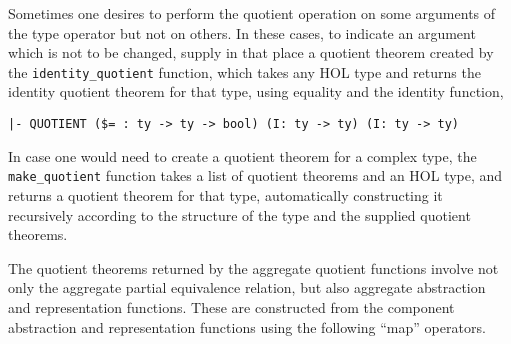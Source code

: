 \documentclass[envcountsame,runningheads]{llncs}
\newcommand{\quotient}{partial equivalence}
\begin{document}
Sometimes one desires to perform the quotient operation on some
arguments of the type operator but not on others. In these
cases, to indicate an argument which is not to be changed,
supply in that place
a quotient theorem
created by the
{\tt identity\_quotient} function, which takes any HOL type and 
returns the identity quotient theorem for that type,
using equality and the identity function,

\begin{center}
{\tt |- QUOTIENT (\$= : ty -> ty -> bool) (I: ty -> ty) (I: ty -> ty)}
\end{center}

In case one would need to create a quotient theorem for a complex type,
the {\tt make\_quotient} function takes a list of
quotient theorems and an HOL type, and returns a quotient theorem for
that type, automatically constructing it recursively
according to the structure of the type
and the supplied quotient theorems.


The quotient theorems returned by the aggregate quotient functions
involve not only the aggregate \quotient{} relation, but also
aggregate abstraction and representation functions.  These are constructed
from the component abstraction and representation functions using the
following ``map'' operators.
\end{document}
